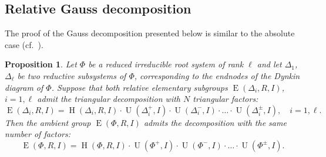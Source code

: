 \documentclass[11pt]{amsart}
\theoremstyle{plain}
\numberwithin{equation}{section}
\numberwithin{lemma}{section}
\newtheorem{prop}[lemma]{Proposition}
\theoremstyle{definition}
\theoremstyle{remark}
\DeclareMathOperator{\E}{E}
\DeclareMathOperator{\Hh}{H}
\DeclareMathOperator{\U}{U}
\begin{document}
\subsection{Relative Gauss decomposition}\label{sec:gauss}
The proof of the Gauss decomposition presented below is similar to the absolute case (cf.~\cite[Theorem~5.1]{Sm12}).
\begin{prop}\label{thm:Gauss}
Let $\Phi$ be a reduced irreducible root system of rank $\ell$ and let $\Delta_1$, $\Delta_\ell$ be
two reductive subsystems of $\Phi$, corresponding to the endnodes of the Dynkin diagram of $\Phi$.
Suppose that both relative elementary subgroups $\E(\Delta_i, R, I)$, $i=1, \ell$ admit the triangular decomposition with $N$ triangular factors:
\[ \E(\Delta_i, R, I) = \Hh(\Delta_i, R, I) \cdot \U(\Delta^+_i, I) \cdot \U(\Delta^-_i, I) \cdot \ldots \cdot \U(\Delta^\pm_i, I), \quad i=1, \ell. \]
Then the ambient group $\E(\Phi, R, I)$ admits the decomposition with the same number of factors:
\[ \E(\Phi, R, I) = \Hh(\Phi, R, I) \cdot \U(\Phi^+, I) \cdot \U(\Phi^-, I) \cdot \ldots \cdot \U(\Phi^\pm, I). \]
\end{prop}
\end{document}
